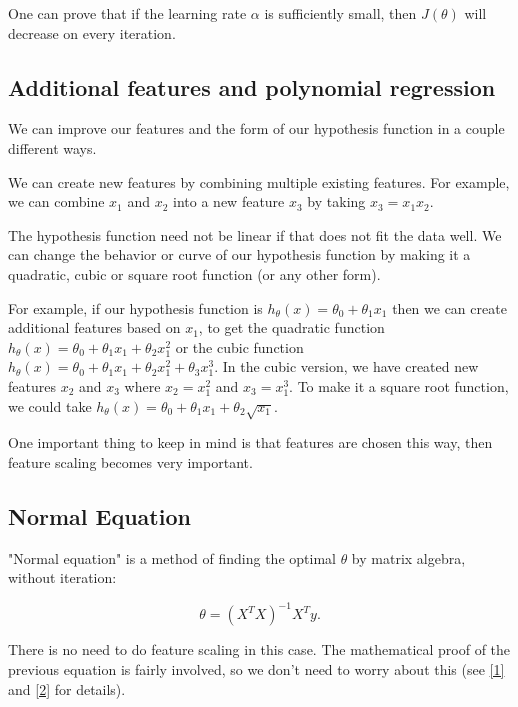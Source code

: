 \documentclass[a4paper,11pt]{report}
\begin{document}
One can prove that if the learning rate $\alpha$ is sufficiently small, then $J(\theta)$ will decrease on every iteration.

\subsection*{Additional features and polynomial regression}

We can improve our features and the form of our hypothesis function in a couple different ways.

We can create new features by combining multiple existing features. For example, we can combine $x_1$ and $x_2$ into a new feature $x_3$ by taking $x_3 = x_1x_2$.

The hypothesis function need not be linear if that does not fit the data well. We can change the behavior or curve of our hypothesis function by making it a quadratic, cubic or square root function (or any other form).

For example, if our hypothesis function is $h_\theta(x) = \theta_0 + \theta_1 x_1$ then we can create additional features based on $x_1$, to get the quadratic function $h_\theta(x) = \theta_0 + \theta_1 x_1 + \theta_2 x_1^2$ or the cubic function $h_\theta(x) = \theta_0 + \theta_1 x_1 + \theta_2 x_1^2 + \theta_3 x_1^3$. In the cubic version, we have created new features $x_2$ and $x_3$ where $x_2 = x_1^2$ and $x_3 = x_1^3$.
To make it a square root function, we could take $h_\theta(x) = \theta_0 + \theta_1 x_1 + \theta_2 \sqrt{x_1}$.

One important thing to keep in mind is that features are chosen this way, then feature scaling becomes very important.

\subsection*{Normal Equation}

"Normal equation" is a method of finding the optimal $\theta$ by matrix algebra, without iteration:

\begin{equation}\label{eq:mul-reg-neq}
\theta = (X^T X)^{-1}X^T y.
\end{equation}

There is no need to do feature scaling in this case. The mathematical proof of the previous equation is fairly involved, so we don't need to worry about this (see \href{https://en.wikipedia.org/wiki/Linear_least_squares_(mathematics)}{[1]} and \href{http://eli.thegreenplace.net/2014/derivation-of-the-normal-equation-for-linear-regression}{[2]} for details).
\end{document}
